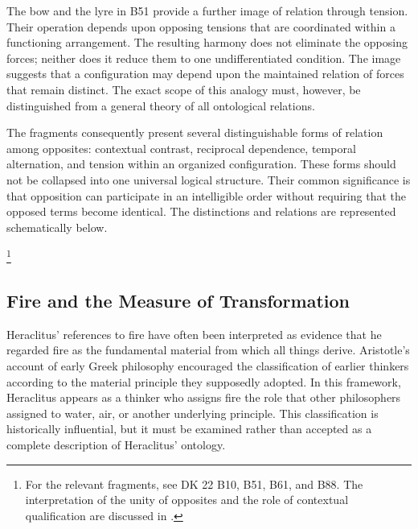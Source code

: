 \label{para:VS.B01.P01.C08.S03.SS04.P004}

The bow and the lyre in B51 provide a further image
of relation through tension. Their operation depends
upon opposing tensions that are coordinated within
a functioning arrangement. The resulting harmony
does not eliminate the opposing forces; neither does
it reduce them to one undifferentiated condition.
The image suggests that a configuration may depend
upon the maintained relation of forces that remain
distinct. The exact scope of this analogy must,
however, be distinguished from a general theory
of all ontological relations.

\label{para:VS.B01.P01.C08.S03.SS04.P005}

The fragments consequently present several distinguishable
forms of relation among opposites: contextual contrast,
reciprocal dependence, temporal alternation, and
tension within an organized configuration. These
forms should not be collapsed into one universal
logical structure. Their common significance is
that opposition can participate in an intelligible
order without requiring that the opposed terms
become identical. The distinctions and relations
are represented schematically below.



\footnote{For the relevant fragments, see DK 22 B10,
B51, B61, and B88. The interpretation of the unity
of opposites and the role of contextual qualification
are discussed in \cite{HeraclitusFragments,
KirkHeraclitus1954,GrahamHeraclitusSEP2023}.}


\subsection{Fire and the Measure of Transformation}

\label{para:VS.B01.P01.C08.S03.SS05.P001}

Heraclitus' references to fire have often been interpreted
as evidence that he regarded fire as the fundamental
material from which all things derive. Aristotle's
account of early Greek philosophy encouraged the
classification of earlier thinkers according to the
material principle they supposedly adopted. In this
framework, Heraclitus appears as a thinker who assigns
fire the role that other philosophers assigned to
water, air, or another underlying principle. This
classification is historically influential, but it
must be examined rather than accepted as a complete
description of Heraclitus' ontology.

